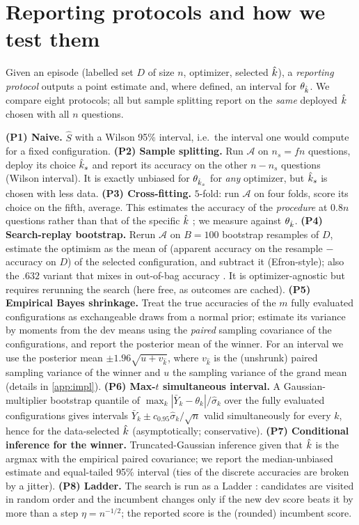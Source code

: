 \section{Reporting protocols and how we test them}
\label{sec:protocols}
Given an episode (labelled set $D$ of size $n$, optimizer, selected $\hat k$), a \emph{reporting protocol} outputs a point estimate and, where defined, an interval for $\theta_{\hat k}$. We compare eight protocols; all but sample splitting report on the \emph{same} deployed $\hat k$ chosen with all $n$ questions.

\textbf{(P1) Naive.} $\hat S$ with a Wilson 95\% interval, i.e.\ the interval one would compute for a fixed configuration.
\textbf{(P2) Sample splitting.} Run $\mathcal A$ on $n_s=fn$ questions, deploy its choice $\hat k_s$ and report its accuracy on the other $n-n_s$ questions (Wilson interval). It is exactly unbiased for $\theta_{\hat k_s}$ for \emph{any} optimizer, but $\hat k_s$ is chosen with less data.
\textbf{(P3) Cross-fitting.} $5$-fold: run $\mathcal A$ on four folds, score its choice on the fifth, average. This estimates the accuracy of the \emph{procedure} at $0.8n$ questions rather than that of the specific $\hat k$ \citep{bates2023cross}; we measure against $\theta_{\hat k}$.
\textbf{(P4) Search-replay bootstrap.} Rerun $\mathcal A$ on $B{=}100$ bootstrap resamples of $D$, estimate the optimism as the mean of (apparent accuracy on the resample $-$ accuracy on $D$) of the selected configuration, and subtract it (Efron-style); also the $.632$ variant that mixes in out-of-bag accuracy \citep{efron1997improvements}. It is optimizer-agnostic but requires rerunning the search (here free, as outcomes are cached).
\textbf{(P5) Empirical Bayes shrinkage.} Treat the true accuracies of the $m$ fully evaluated configurations as exchangeable draws from a normal prior; estimate its variance by moments from the dev means using the \emph{paired} sampling covariance of the configurations, and report the posterior mean of the winner. For an interval we use the posterior mean $\pm1.96\sqrt{u+v_{\hat k}}$, where $v_{\hat k}$ is the (unshrunk) paired sampling variance of the winner and $u$ the sampling variance of the grand mean (details in \cref{app:impl}).
\textbf{(P6) Max-$t$ simultaneous interval.} A Gaussian-multiplier bootstrap \citep{chernozhukov2013gaussian} quantile of $\max_k |\bar Y_k-\theta_k|/\hat\sigma_k$ over the fully evaluated configurations gives intervals $\bar Y_k\pm c_{0.95}\hat\sigma_k/\sqrt n$ valid simultaneously for every $k$, hence for the data-selected $\hat k$ (asymptotically; conservative).
\textbf{(P7) Conditional inference for the winner.} Truncated-Gaussian inference given that $\hat k$ is the argmax \citep{lee2016exact,andrews2024inference} with the empirical paired covariance; we report the median-unbiased estimate and equal-tailed 95\% interval (ties of the discrete accuracies are broken by a jitter).
\textbf{(P8) Ladder.} The search is run as a Ladder \citep{blum2015ladder}: candidates are visited in random order and the incumbent changes only if the new dev score beats it by more than a step $\eta=n^{-1/2}$; the reported score is the (rounded) incumbent score.

